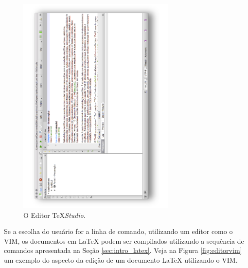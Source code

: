 \begin{figure}[H]
\caption{O Editor \TeX\textit{Studio}.}
\vspace{6mm}
  \begin{center}
    \includegraphics[width=0.7\textwidth,angle=-90]{./docs/figs/texstudio.pdf}
  \end{center}
\vspace{4mm}
\label{fig:editortexstudio}
\end{figure}

Se a escolha do usuário for a linha de comando, utilizando um editor como o VIM, os documentos em \LaTeX{} podem ser compilados utilizando a sequência de comandos apresentada na Seção \ref{sec:intro_latex}. Veja na Figura \ref{fig:editorvim} um exemplo do aspecto da edição de um documento \LaTeX{} utilizando o VIM.

